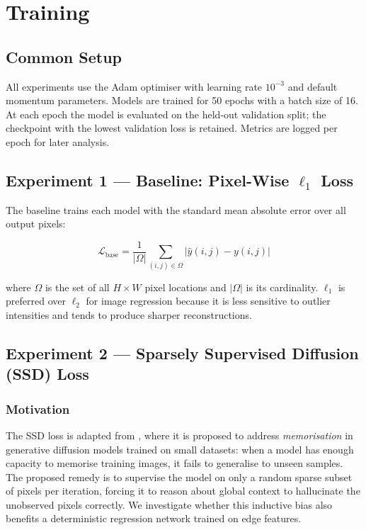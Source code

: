 \documentclass[10pt,twocolumn]{article}
\begin{document}
\section{Training}
\label{sec:training}

\subsection{Common Setup}

All experiments use the Adam optimiser \cite{adam2014} with learning rate
$10^{-3}$ and default momentum parameters.
Models are trained for 50 epochs with a batch size of 16.
At each epoch the model is evaluated on the held-out validation split; the
checkpoint with the lowest validation loss is retained.
Metrics are logged per epoch for later analysis.

\subsection{Experiment 1 --- Baseline: Pixel-Wise $\ell_1$ Loss}
\label{sec:baseline}

The baseline trains each model with the standard mean absolute error over
all output pixels:

\begin{equation}
  \mathcal{L}_{\text{base}} = \frac{1}{|\Omega|}
    \sum_{(i,j)\in\Omega} \bigl|\hat{y}(i,j) - y(i,j)\bigr|
  \label{eq:l1}
\end{equation}

where $\Omega$ is the set of all $H\times W$ pixel locations and $|\Omega|$
is its cardinality.
$\ell_1$ is preferred over $\ell_2$ for image regression because it is less
sensitive to outlier intensities and tends to produce sharper reconstructions.

\subsection{Experiment 2 --- Sparsely Supervised Diffusion (SSD) Loss}
\label{sec:ssd}

\subsubsection*{Motivation}

The SSD loss is adapted from \cite{ssd2025}, where it is proposed to address
\emph{memorisation} in generative diffusion models trained on small datasets:
when a model has enough capacity to memorise training images, it fails to
generalise to unseen samples.
The proposed remedy is to supervise the model on only a random sparse subset
of pixels per iteration, forcing it to reason about global context to
hallucinate the unobserved pixels correctly.
We investigate whether this inductive bias also benefits a deterministic
regression network trained on edge features.
\end{document}

